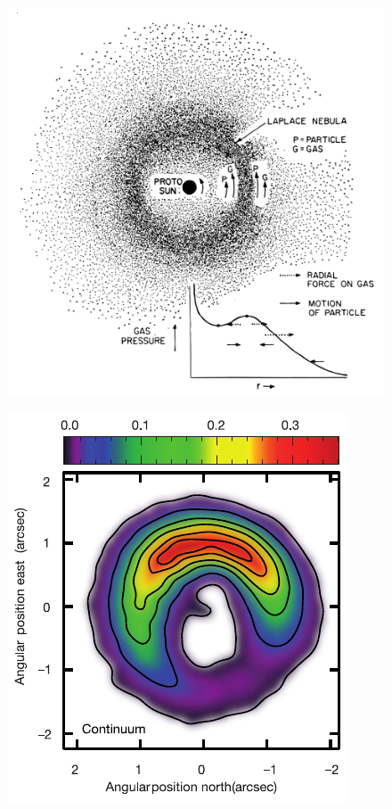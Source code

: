 \documentclass[10pt,fleqn,twoside]{article}
\begin{document}
\begin{figure}
\centering
\begin{minipage}[b]{.47\textwidth}
  \centering
  \includegraphics[width=\linewidth]{figure/Whipple1972-Fig1_traced}
  \label{fig:whipple}
\end{minipage}%
\hspace{0.05\textwidth}
\begin{minipage}[b]{.47\textwidth}
  \centering
  \includegraphics[width=\linewidth]{figure/casassus2}

\end{minipage}
\end{figure}
\end{document}
